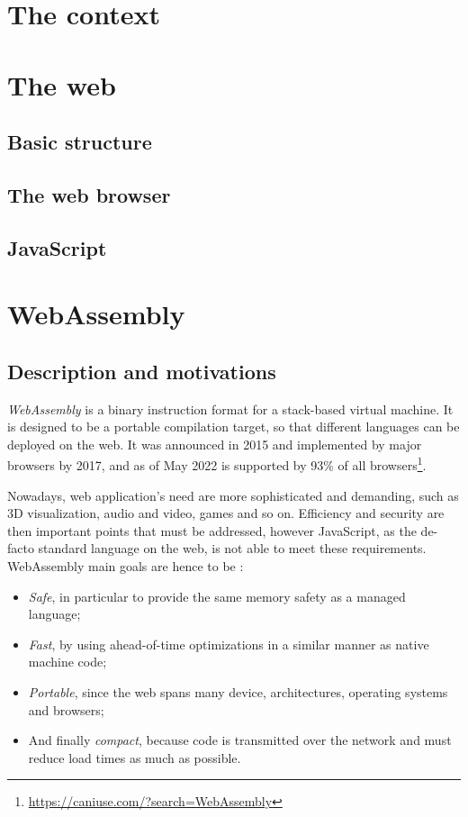 \section{The context}

\section{The web}
\subsection{Basic structure}
\subsection{The web browser}
\subsection{JavaScript}

\section{WebAssembly}
\subsection{Description and motivations}

\textit{WebAssembly} \cite{wasm-website} is a binary instruction format for a stack-based virtual machine.
It is designed to be a portable compilation target, so that different languages can be deployed on the web.
It was announced in 2015 and implemented by major browsers by 2017, and as of May 2022 is supported
by 93\% of all browsers\footnote{\url{https://caniuse.com/?search=WebAssembly}}.

Nowadays, web application's need are more sophisticated and demanding, such as 3D visualization, audio and video,
games and so on. Efficiency and security are then important points that must be addressed, however JavaScript,
as the de-facto standard language on the web, is not able to meet these requirements.
WebAssembly main goals are hence to be \cite{bringing-the-web-up-to-speed-2017}:
\begin{itemize}
  \item \textit{Safe}, in particular to provide the same memory safety as a managed language;
  \item \textit{Fast}, by using ahead-of-time optimizations in a similar manner as native machine code;
  \item \textit{Portable}, since the web spans many device, architectures, operating systems and browsers;
  \item And finally \textit{compact}, because code is transmitted over the network and must reduce load times as much as possible.
\end{itemize}

